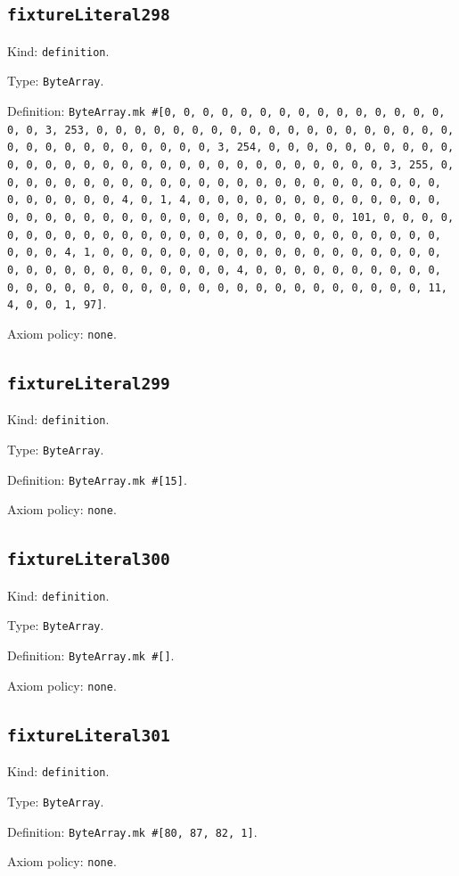 \documentclass[11pt]{article}
\begin{document}
\subsection*{\texttt{fixtureLiteral298}}
\noindent Kind: \texttt{definition}.\par
\noindent Type: \texttt{ByteArray}.\par
\noindent Definition: \texttt{ByteArray.mk \#[0, 0, 0, 0, 0, 0, 0, 0, 0, 0, 0, 0, 0, 0, 0, 0, 0, 3, 253, 0, 0, 0, 0, 0, 0, 0, 0, 0, 0, 0, 0, 0, 0, 0, 0, 0, 0, 0, 0, 0, 0, 0, 0, 0, 0, 0, 0, 0, 0, 3, 254, 0, 0, 0, 0, 0, 0, 0, 0, 0, 0, 0, 0, 0, 0, 0, 0, 0, 0, 0, 0, 0, 0, 0, 0, 0, 0, 0, 0, 0, 0, 3, 255, 0, 0, 0, 0, 0, 0, 0, 0, 0, 0, 0, 0, 0, 0, 0, 0, 0, 0, 0, 0, 0, 0, 0, 0, 0, 0, 0, 0, 0, 0, 4, 0, 1, 4, 0, 0, 0, 0, 0, 0, 0, 0, 0, 0, 0, 0, 0, 0, 0, 0, 0, 0, 0, 0, 0, 0, 0, 0, 0, 0, 0, 0, 0, 0, 0, 101, 0, 0, 0, 0, 0, 0, 0, 0, 0, 0, 0, 0, 0, 0, 0, 0, 0, 0, 0, 0, 0, 0, 0, 0, 0, 0, 0, 0, 0, 0, 4, 1, 0, 0, 0, 0, 0, 0, 0, 0, 0, 0, 0, 0, 0, 0, 0, 0, 0, 0, 0, 0, 0, 0, 0, 0, 0, 0, 0, 0, 0, 0, 4, 0, 0, 0, 0, 0, 0, 0, 0, 0, 0, 0, 0, 0, 0, 0, 0, 0, 0, 0, 0, 0, 0, 0, 0, 0, 0, 0, 0, 0, 0, 0, 0, 11, 4, 0, 0, 1, 97]}.\par
\noindent Axiom policy: \texttt{none}.\par
\subsection*{\texttt{fixtureLiteral299}}
\noindent Kind: \texttt{definition}.\par
\noindent Type: \texttt{ByteArray}.\par
\noindent Definition: \texttt{ByteArray.mk \#[15]}.\par
\noindent Axiom policy: \texttt{none}.\par
\subsection*{\texttt{fixtureLiteral300}}
\noindent Kind: \texttt{definition}.\par
\noindent Type: \texttt{ByteArray}.\par
\noindent Definition: \texttt{ByteArray.mk \#[]}.\par
\noindent Axiom policy: \texttt{none}.\par
\subsection*{\texttt{fixtureLiteral301}}
\noindent Kind: \texttt{definition}.\par
\noindent Type: \texttt{ByteArray}.\par
\noindent Definition: \texttt{ByteArray.mk \#[80, 87, 82, 1]}.\par
\noindent Axiom policy: \texttt{none}.\par
\end{document}
